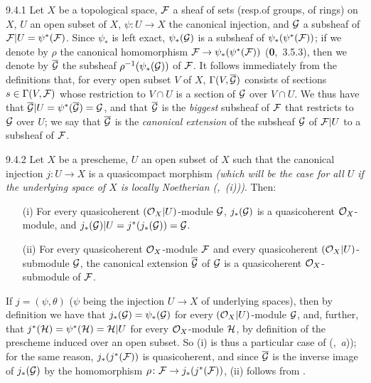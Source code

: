 
\begin{env}{9.4.1}
\label{env-1.9.4.1}
Let $X$ be a topological space, $\mathcal{F}$ a
sheaf of sets (resp.of groups, of rings) on $X$, $U$ an open subset of $X$,
$\psi\colon U\to X$ the canonical injection, and $\mathcal{G}$ a subsheaf of
$\mathcal{F}|U=\psi^\ast(\mathcal{F})$. Since $\psi_\ast$ is left exact,
$\psi_\ast(\mathcal{G})$ is a subsheaf of $\psi_\ast(\psi^\ast(\mathcal{F}))$; if we denote
by $\rho$ the canonical homomorphism $\mathcal{F}\to\psi_\ast(\psi^\ast(\mathcal{F}))$
(\textbf{0},~3.5.3), then we denote by $\overline{\mathcal{G}}$ the subsheaf
$\rho^{-1}(\psi_\ast(\mathcal{G}))$ of $\mathcal{F}$. It follows immediately from the
definitions that, for every open subset $V$ of $X$,
$\Gamma(V,\overline{\mathcal{G}})$ consists of sections $s\in\Gamma(V,\mathcal{F})$
whose restriction to $V\cap U$ is a section of $\mathcal{G}$ over $V\cap U$. We
thus have that $\overline{\mathcal{G}}|U=\psi^\ast(\overline{\mathcal{G}})=\mathcal{G}$,
and that $\overline{\mathcal{G}}$ is the \emph{biggest} subsheaf of $\mathcal{F}$
that restricts to $\mathcal{G}$ over $U$; we say that $\overline{\mathcal{G}}$ is
the \emph{canonical extension} of the subsheaf $\mathcal{G}$ of $\mathcal{F}|U$ to a
subsheaf of $\mathcal{F}$.
\end{env}

\begin{env}[Proposition]{9.4.2}
\label{prop-1.9.4.2}
Let $X$ be a prescheme, $U$ an open subset of $X$ such that the canonical injection
$j\colon U\to X$ is a quasicompact morphism \emph{(which will be the case for
\emph{all} $U$ if the underlying space of $X$ is \emph{locally Noetherian}
{\normalfont(,~(i))})}. Then:
\begin{itemize}
  \item[(i)] For every quasicoherent $(\mathcal{O}_X|U)$-module $\mathcal{G}$, $j_\ast(\mathcal{G})$
             is a quasicoherent $\mathcal{O}_X$-module, and
             $j_\ast(\mathcal{G})|U=j^\ast(j_\ast(\mathcal{G}))=\mathcal{G}$.
  \item[(ii)] For every quasicoherent $\mathcal{O}_X$-module $\mathcal{F}$ and every quasicoherent
              $(\mathcal{O}_X|U)$-submodule $\mathcal{G}$, the canonical extension
              $\overline{\mathcal{G}}$ of $\mathcal{G}$  is a
              quasicoherent $\mathcal{O}_X$-submodule of $\mathcal{F}$.
\end{itemize}
\end{env}

If $j=(\psi,\theta)$ ($\psi$ being the injection $U\to X$ of underlying spaces),
then by definition we have that $j_\ast(\mathcal{G})=\psi_\ast(\mathcal{G})$ for every
$(\mathcal{O}_X|U)$-module $\mathcal{G}$, and, further, that
$j^\ast(\mathcal{H})=\psi^\ast(\mathcal{H})=\mathcal{H}|U$ for every $\mathcal{O}_X$-module
$\mathcal{H}$, by definition of the prescheme induced over an open subset. So (i)
is thus a particular case of (,~\emph{a})); for the same reason,
$j_\ast(j^\ast(\mathcal{F}))$ is quasicoherent, and since $\overline{\mathcal{G}}$ is the
inverse image of $j_\ast(\mathcal{G})$ by the homomorphism $\rho\colon\mathcal{F}\to
j_\ast(j^\ast(\mathcal{F}))$, (ii) follows from .
 
